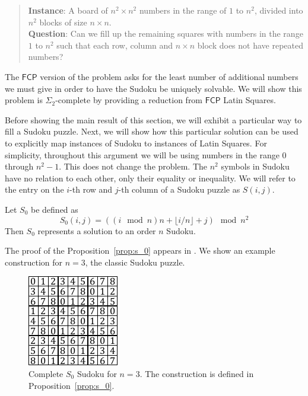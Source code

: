 \documentclass[runningheads,a4paper]{llncs}
\begin{document}
\begin{quote}
\textbf{Instance}: A board of $n^2 \times n^2$ numbers in the range of $1$ to $n^2$, divided into $n^2$ blocks of size $n \times n$.\\
\textbf{Question}: Can we fill up the remaining squares with numbers in the range $1$ to $n^2$ such that each row, column and $n \times n$ block does not have repeated numbers?
\end{quote}

The $\mathsf{FCP}$ version of the problem asks for the least number of additional numbers we must give in order to have the Sudoku be uniquely solvable. We will show this problem is $\Sigma_2$-complete by providing a reduction from $\mathsf{FCP}$ Latin Squares. 

Before showing the main result of this section, we will exhibit a particular way to fill a Sudoku puzzle. Next, we will show how this particular solution can be used to explicitly map instances of Sudoku to instances of Latin Squares. For simplicity, throughout this argument we will be using numbers in the range $0$ through $n^2 - 1$. This does not change the problem. The $n^2$ symbols in Sudoku have no relation to each other, only their equality or inequality. We will refer to the entry on the $i$-th row and $j$-th column of a Sudoku puzzle as $S(i,j)$.

\begin{proposition}
\label{prop:s_0}
Let $S_0$ be defined as
\[ S_0 (i,j) = ((i \mod n) n + \lfloor i/n \rfloor + j) \mod n^2 \]
Then $S_0$ represents a solution to an order $n$ Sudoku.
\end{proposition}

The proof of the Proposition~\ref{prop:s_0} appears in \cite{takayaki2003complexity}. We show an example construction for $n=3$, the classic Sudoku puzzle.

\begin{figure}
\centering
\label{fig:s_0}
\includegraphics[width=0.6\linewidth]{sudoku_s_0.pdf}
\caption{Complete $S_0$ Sudoku for $n = 3$. The construction is defined in Proposition~\ref{prop:s_0}.}
\end{figure}
\end{document}
